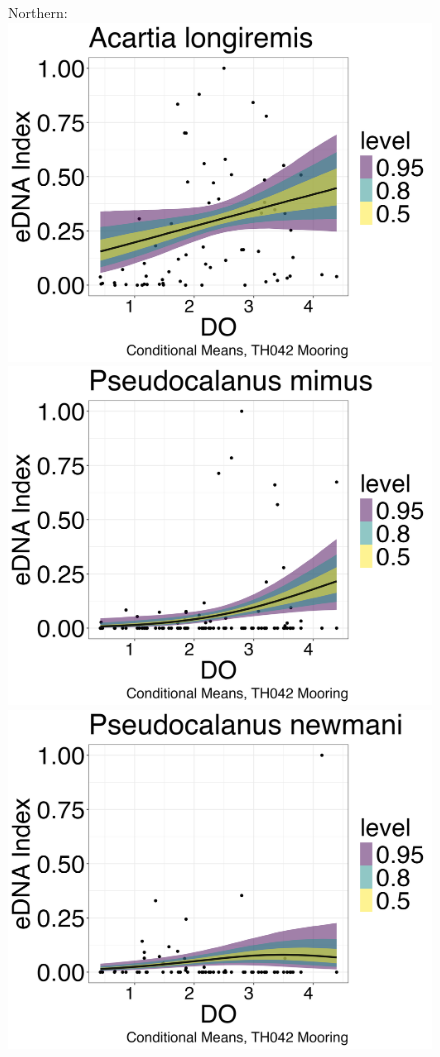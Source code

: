 \documentclass[12pt,twoside]{reedthesis}
\begin{document}
	\begin{figure}[h]
		\begin{center}
			Northern: \\
			\includegraphics[scale=0.25]{Alongiremis_ZOIB_Means_noOut}
			\includegraphics[scale=0.25]{Pmimus_ZOIB_Means_noOut}
			\includegraphics[scale=0.25]{Pnewmani_ZOIB_Means_noOut}

\end{center}
\end{figure}
\end{document}
